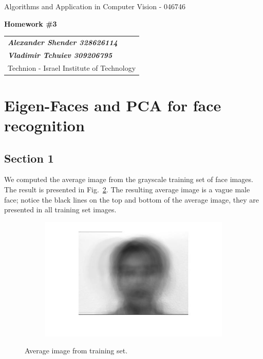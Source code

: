 \documentclass[a4paper]{iacas}
\begin{document}
\begin{center}
	\large Algorithms and Application in Computer Vision - 046746
\end{center}
\begin{center}
	\large\textbf{Homework \#3}
\end{center}


\begin{tabular}{l}
	\\
	{\bf\textit{Alexander Shender 328626114}} \\
	{\bf\textit{Vladimir Tchuiev 309206795}} \\
	Technion - Israel Institute of Technology
\end{tabular}


\vspace{2em}

\section{Eigen-Faces and PCA for face recognition}


\subsection{Section 1}

We computed the average image from the grayscale training set of face images. The result is presented in Fig.~\ref{fig:100}. The resulting average image is a vague male face; notice the black lines on the top and bottom of the average image, they are presented in all training set images.

\begin{figure}[!htbp]
	\centering
	\begin{subfigure}[b]{0.6\textwidth}
		\includegraphics[width=\textwidth]{101.jpg}
		\label{fig:101}
	\end{subfigure}
	
	\caption{Average image from training set.}
	\label{fig:100}
\end{figure}
\end{document}
